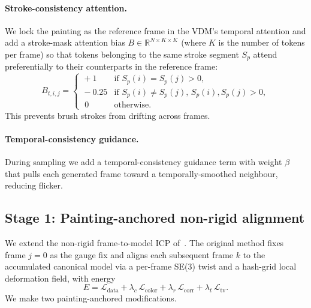 \paragraph{Stroke-consistency attention.}
We lock the painting as the reference frame in the VDM's temporal attention
and add a stroke-mask attention bias $B \in \mathbb{R}^{N\times K\times K}$
(where $K$ is the number of tokens per frame) so that tokens belonging to the
same stroke segment $S_p$ attend preferentially to their counterparts in the
reference frame:
\begin{equation}
B_{t,i,j} = \!\begin{cases}
\!+1 & \text{if } S_p(i)\!=\!S_p(j)\!>\!0, \\
\!-0.25 & \text{if } S_p(i)\!\neq\!S_p(j),\, S_p(i),S_p(j)\!>\!0, \\
\;0 & \text{otherwise.}
\end{cases}
\end{equation}
This prevents brush strokes from drifting across frames.

\paragraph{Temporal-consistency guidance.}
During sampling we add a temporal-consistency guidance term with weight
$\beta$ that pulls each generated frame toward a temporally-smoothed
neighbour, reducing flicker.

\subsection{Stage 1: Painting-anchored non-rigid alignment}
\label{sec:stage1}

We extend the non-rigid frame-to-model ICP
of~\cite{hoellein2026worldreconstruction}. The original method fixes frame
$j{=}0$ as the gauge fix and aligns each subsequent frame $k$ to the
accumulated canonical model via a per-frame SE(3) twist and a hash-grid local
deformation field, with energy
\begin{equation}
E = \mathcal{L}_\text{data} + \lambda_c\, \mathcal{L}_\text{color}
+ \lambda_r\, \mathcal{L}_\text{corr} + \lambda_t\, \mathcal{L}_\text{tv}.
\label{eq:icp}
\end{equation}
We make two painting-anchored modifications.

